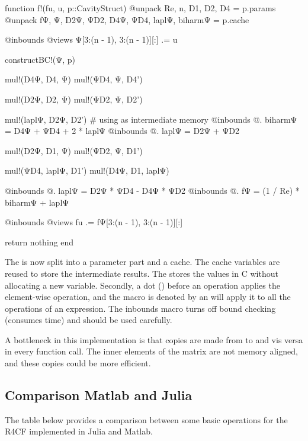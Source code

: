 \begin{jllisting}
function f!(fu, u, p::CavityStruct)
    @unpack Re, n, D1, D2, D4 = p.params
    @unpack fΨ, Ψ, D2Ψ, ΨD2, D4Ψ, ΨD4, laplΨ, biharmΨ = p.cache

    @inbounds @views Ψ[3:(n - 1), 3:(n - 1)][:] .= u

    constructBC!(Ψ, p)

    mul!(D4Ψ, D4, Ψ)
    mul!(ΨD4, Ψ, D4')

    mul!(D2Ψ, D2, Ψ)
    mul!(ΨD2, Ψ, D2')

    mul!(laplΨ, D2Ψ, D2') # using as intermediate memory
    @inbounds @. biharmΨ = D4Ψ + ΨD4 + 2 * laplΨ
    @inbounds @. laplΨ = D2Ψ + ΨD2

    mul!(D2Ψ, D1, Ψ)
    mul!(ΨD2, Ψ, D1')

    mul!(ΨD4, laplΨ, D1')
    mul!(D4Ψ, D1, laplΨ)

    @inbounds @. laplΨ = D2Ψ * ΨD4 - D4Ψ * ΨD2
    @inbounds @. fΨ = (1 / Re) * biharmΨ + laplΨ

    @inbounds @views fu .= fΨ[3:(n - 1), 3:(n - 1)][:]

    return nothing
end
\end{jllisting}

The   is now split into a parameter part and a cache.
The cache variables are reused to store the intermediate results. The
 stores the values in C without allocating a new variable.
Secondly, a dot () before an operation applies the element-wise
operation, and the macro is denoted by an  will apply it to all the
operations of an expression. The  inbounds macro turns off bound
checking (consumes time) and should be used carefully.

A bottleneck in this implementation is that copies are made from  to
 and vis versa in every function call. The inner elements of the
matrix  are not memory aligned, and these copies could be more
efficient.

\subsection{Comparison Matlab and Julia}

The table below provides a comparison between some basic operations for the
R4CF implemented in Julia and Matlab. 

